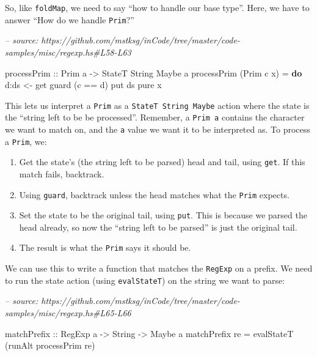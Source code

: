 \documentclass[]{article}
\newenvironment{Shaded}{}{}
\newcommand{\CommentTok}[1]{\textcolor[rgb]{0.38,0.63,0.69}{\textit{#1}}}
\newcommand{\DataTypeTok}[1]{\textcolor[rgb]{0.56,0.13,0.00}{#1}}
\newcommand{\FunctionTok}[1]{\textcolor[rgb]{0.02,0.16,0.49}{#1}}
\newcommand{\KeywordTok}[1]{\textcolor[rgb]{0.00,0.44,0.13}{\textbf{#1}}}
\newcommand{\NormalTok}[1]{#1}
\newcommand{\OtherTok}[1]{\textcolor[rgb]{0.00,0.44,0.13}{#1}}
\begin{document}
So, like \texttt{foldMap}, we need to say ``how to handle our base type''. Here,
we have to answer ``How do we handle \texttt{Prim}?''

\begin{Shaded}
\begin{Highlighting}[]
\CommentTok{-- source: https://github.com/mstksg/inCode/tree/master/code-samples/misc/regexp.hs#L58-L63}

\OtherTok{processPrim ::} \DataTypeTok{Prim}\NormalTok{ a }\OtherTok{->} \DataTypeTok{StateT} \DataTypeTok{String} \DataTypeTok{Maybe}\NormalTok{ a}
\NormalTok{processPrim (}\DataTypeTok{Prim}\NormalTok{ c x) }\FunctionTok{=} \KeywordTok{do}
\NormalTok{    d}\FunctionTok{:}\NormalTok{ds }\OtherTok{<-}\NormalTok{ get}
\NormalTok{    guard (c }\FunctionTok{==}\NormalTok{ d)}
\NormalTok{    put ds}
    \FunctionTok{pure}\NormalTok{ x}
\end{Highlighting}
\end{Shaded}

This lets us interpret a \texttt{Prim} as a \texttt{StateT\ String\ Maybe}
action where the state is the ``string left to be be processed''. Remember, a
\texttt{Prim\ a} contains the character we want to match on, and the \texttt{a}
value we want it to be interpreted as. To process a \texttt{Prim}, we:

\begin{enumerate}
\def\labelenumi{\arabic{enumi}.}
\tightlist
\item
  Get the state's (the string left to be parsed) head and tail, using
  \texttt{get}. If this match fails, backtrack.
\item
  Using \texttt{guard}, backtrack unless the head matches what the \texttt{Prim}
  expects.
\item
  Set the state to be the original tail, using \texttt{put}. This is because we
  parsed the head already, so now the ``string left to be parsed'' is just the
  original tail.
\item
  The result is what the \texttt{Prim} says it should be.
\end{enumerate}

We can use this to write a function that matches the \texttt{RegExp} on a
prefix. We need to run the state action (using \texttt{evalStateT}) on the
string we want to parse:

\begin{Shaded}
\begin{Highlighting}[]
\CommentTok{-- source: https://github.com/mstksg/inCode/tree/master/code-samples/misc/regexp.hs#L65-L66}

\OtherTok{matchPrefix ::} \DataTypeTok{RegExp}\NormalTok{ a }\OtherTok{->} \DataTypeTok{String} \OtherTok{->} \DataTypeTok{Maybe}\NormalTok{ a}
\NormalTok{matchPrefix re }\FunctionTok{=}\NormalTok{ evalStateT (runAlt processPrim re)}
\end{Highlighting}
\end{Shaded}
\end{document}
